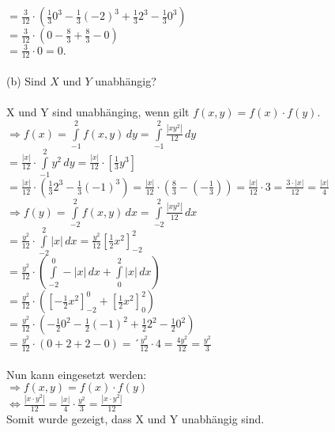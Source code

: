 \documentclass[a4paper]{article}
\begin{document}
\hspace*{3.57cm}$= \frac{3}{12} \cdot \left( \frac{1}{3} 0^3 - \frac{1}{3} (-2)^3 + \frac{1}{3} 2^3 - \frac{1}{3} 0^3 \right)$\\
\hspace*{3.57cm}$= \frac{3}{12} \cdot \left( 0 - \frac{8}{3} + \frac{8}{3} - 0 \right)$\\
\hspace*{3.57cm}$= \frac{3}{12} \cdot 0 = 0.$\\\\
(b) Sind $X$ und $Y$ unabhängig?\\\\
X und Y sind unabhänging, wenn gilt $f(x,y) = f(x) \cdot f(y)$.\\
$\Rightarrow f(x) = \int\limits^2_{-1} f(x,y) \, dy = \int\limits^2_{-1} \frac{\left| xy^2 \right|}{12} \, dy$\\
\hspace*{1.25cm}$= \frac{\left| x \right|}{12} \cdot \int\limits^2_{-1} y^2 \, dy = \frac{\left| x \right|}{12} \cdot \left[ \frac{1}{3}y^3 \right]$\\
\hspace*{1.25cm}$= \frac{\left| x \right|}{12} \cdot \left( \frac{1}{3}2^3 - \frac{1}{3}(-1)^3 \right) = \frac{\left| x \right|}{12} \cdot \left( \frac{8}{3} - \left( - \frac{1}{3} \right) \right) = \frac{\left| x \right|}{12} \cdot 3 = \frac{3 \cdot \left| x \right|}{12} = \frac{\left| x \right|}{4}$\\
$\Rightarrow f(y) = \int\limits^2_{-2} f(x,y) \, dx = \int\limits^2_{-2} \frac{\left| xy^2 \right|}{12} \, dx$\\
\hspace*{1.25cm}$= \frac{y^2}{12} \cdot \int\limits^2_{-2} \left| x \right| \, dx = \frac{y^2}{12} \left[ \frac{1}{2} x^2 \right]^2_{-2}$\\
\hspace*{1.25cm}$= \frac{y^2}{12} \cdot \left( \int\limits^0_{-2} - \left| x \right| \, dx + \int\limits^2_0 \left| x \right| \, dx \right)$\\
\hspace*{1.25cm}$= \frac{y^2}{12} \cdot \left( \left[ - \frac{1}{2}x^2 \right]^0_{-2} + \left[ \frac{1}{2}x^2 \right]^2_0 \right)$\\
\hspace*{1.25cm}$= \frac{y^2}{12} \cdot \left( - \frac{1}{2}0^2 - \frac{1}{2}(-1)^2 + \frac{1}{2}2^2 - \frac{1}{2}0^2 \right)$\\
\hspace*{1.25cm}$= \frac{y^2}{12} \cdot \left( 0 + 2 + 2 - 0 \right) = ´\frac{y^2}{12} \cdot 4 = \frac{4 y^2}{12} = \frac{y^2}{3}$\\\\
Nun kann eingesetzt werden:\\
$\Rightarrow f(x,y) = f(x) \cdot f(y)$\\
$\Leftrightarrow \frac{\left| x \cdot y^2 \right|}{12} = \frac{\left| x \right|}{4} \cdot \frac{y^2}{3} = \frac{\left| x \cdot y^2 \right|}{12}$\\
Somit wurde gezeigt, dass X und Y unabhängig sind.
\\\\
\end{document}

